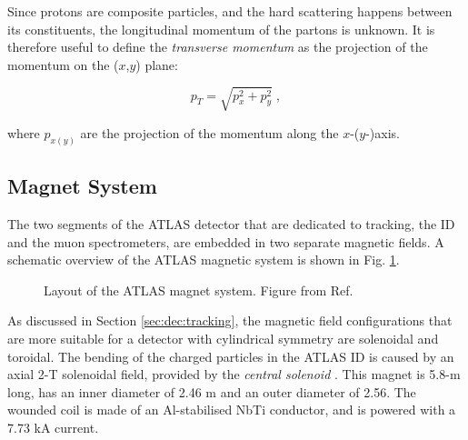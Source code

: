 Since protons are composite particles, and the hard scattering happens between its constituents, the longitudinal momentum of the partons is unknown. It is therefore useful to define the \textit{transverse momentum} as the projection of the momentum on the ($x$,$y$) plane: 

\begin{equation}
\label{eq:cern:pt}
p_T = \sqrt{p_x^2 + p_y^2} \; ,
\end{equation}

where $p_{x(y)}$ are the projection of the momentum along the $x$-($y$-)axis.




\subsection{Magnet System}

The two segments of the ATLAS detector that are dedicated to tracking, the ID and the muon spectrometers, are embedded in two separate magnetic fields. A schematic overview of the ATLAS magnetic system is shown in Fig. \ref{fig:atlas:magnet}.
\label{sec:cern:atlasmagnets}
\begin{figure}[ht]
\centering
{}
\caption{Layout of the ATLAS magnet system. Figure from Ref. \cite{Goodson}}
\label{fig:atlas:magnet}
\end{figure}

As discussed in Section \ref{sec:dec:tracking}, the magnetic field configurations that are more suitable for a detector with cylindrical symmetry are solenoidal and toroidal. The bending of the charged particles in the ATLAS ID is caused by an axial 2-T solenoidal field, provided by the \textit{central solenoid} \cite{YAMAMOTO200853}. This magnet is 5.8-m long, has an inner diameter of 2.46 m and an outer diameter of 2.56. The wounded coil is made of an Al-stabilised NbTi conductor, and is powered with a 7.73 kA current. 


